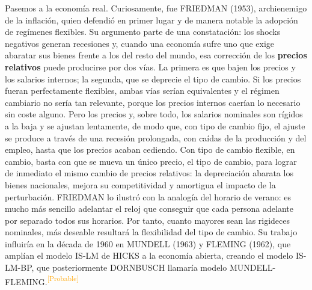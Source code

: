 \documentclass[10pt,a4paper]{article}
\begin{document}
Pasemos a la economía real. Curiosamente, fue FRIEDMAN (1953), archienemigo de la inflación, quien defendió en primer lugar y de manera notable la adopción de regímenes flexibles. Su argumento parte de una constatación: los shocks negativos generan recesiones y, cuando una economía sufre uno que exige abaratar sus bienes frente a los del resto del mundo, esa corrección de los \textbf{precios relativos} puede producirse por dos vías. La primera es que bajen los precios y los salarios internos; la segunda, que se deprecie el tipo de cambio. Si los precios fueran perfectamente flexibles, ambas vías serían equivalentes y el régimen cambiario no sería tan relevante, porque los precios internos caerían lo necesario sin coste alguno. Pero los precios y, sobre todo, los salarios nominales son rígidos a la baja y se ajustan lentamente, de modo que, con tipo de cambio fijo, el ajuste se produce a través de una recesión prolongada, con caídas de la producción y del empleo, hasta que los precios acaban cediendo. Con tipo de cambio flexible, en cambio, basta con que se mueva un único precio, el tipo de cambio, para lograr de inmediato el mismo cambio de precios relativos: la depreciación abarata los bienes nacionales, mejora su competitividad y amortigua el impacto de la perturbación. FRIEDMAN lo ilustró con la analogía del horario de verano: es mucho más sencillo adelantar el reloj que conseguir que cada persona adelante por separado todos sus horarios. Por tanto, cuanto mayores sean las rigideces nominales, más deseable resultará la flexibilidad del tipo de cambio. Su trabajo influiría en la década de 1960 en MUNDELL (1963) y FLEMING (1962), que amplían el modelo IS-LM de HICKS a la economía abierta, creando el modelo IS-LM-BP, que posteriormente DORNBUSCH llamaría modelo MUNDELL-FLEMING.\textcolor{orange}{\textsuperscript{[Probable]}}
\end{document}
